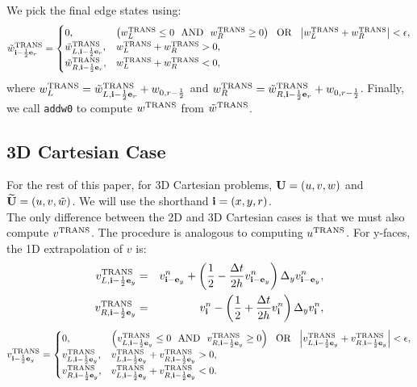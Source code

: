 We pick the final edge states using:
\begin{equation}
\tilde{w}^{\rm TRANS}_{{\bf i}-\frac{1}{2}{\bf e}_r} =
\begin{cases}
0, & \left(w_L^{\rm TRANS} \le 0 ~~ {\rm AND} ~~ w_R^{\rm TRANS} \ge 0\right) ~~ {\rm OR} ~~ \left|w_L^{\rm TRANS} + w_R^{\rm TRANS}\right| < \epsilon, \\
\tilde{w}_{L,{\bf i}-\frac{1}{2}{\bf e}_r}^{\rm TRANS}, & w_L^{\rm TRANS} + w_R^{\rm TRANS} > 0, \\
\tilde{w}_{R,{\bf i}-\frac{1}{2}{\bf e}_r}^{\rm TRANS}, & w_L^{\rm TRANS} + w_R^{\rm TRANS} < 0, \\
\end{cases}
\end{equation}
where $w_L^{\rm TRANS} = \tilde{w}_{L,{\bf i}-\frac{1}{2}{\bf e}_r}^{\rm TRANS} + w_{0,r-\frac{1}{2}}$
and $w_R^{\rm TRANS} = \tilde{w}_{R,{\bf i}-\frac{1}{2}{\bf e}_r}^{\rm TRANS} + w_{0,r-\frac{1}{2}}$.
Finally, we call {\tt addw0} to compute $w^{\rm TRANS}$ from
$\tilde{w}^{\rm TRANS}$.

\subsection{3D Cartesian Case}
For the rest of this paper, for 3D Cartesian problems, ${\bf U} = (u,v,w)$
and $\widetilde{{\bf U}} = (u,v,\tilde{w})$.  We will use the shorthand ${\bf i} = (x,y,r)$.\\

The only difference between the 2D and 3D Cartesian cases is that we
must also compute $v^{\rm TRANS}$.  The procedure is analogous to
computing $u^{\rm TRANS}$.  For y-faces, the 1D extrapolation of $v$ is:
\begin{eqnarray}
v_{L,{\bf i}-\frac{1}{2}{\bf e}_y}^{\rm TRANS} &=& v_{{\bf i}-{\bf e}_y}^n + \left(\frac{1}{2} - \frac{\Delta t}{2h}v_{{\bf i}-{\bf e}_y}^n\right)\Delta_y v_{{\bf i}-{\bf e}_y}^n, \\
v_{R,{\bf i}-\frac{1}{2}{\bf e}_y}^{\rm TRANS} &=& v_{{\bf i}}^n - \left(\frac{1}{2} + \frac{\Delta t}{2h}v_{{\bf i}}^n\right)\Delta_y v_{{\bf i}}^n,
\end{eqnarray}
\begin{equation}
v^{\rm TRANS}_{{\bf i}-\frac{1}{2}{\bf e}_y} =
\begin{cases}
0, & \left(v_{L,{\bf i}-\frac{1}{2}{\bf e}_y}^{\rm TRANS} \le 0 ~~ {\rm AND} ~~ v_{R,{\bf i}-\frac{1}{2}{\bf e}_y}^{\rm TRANS} \ge 0\right) ~~ {\rm OR} ~~ \left|v_{L,{\bf i}-\frac{1}{2}{\bf e}_y}^{\rm TRANS} + v_{R,{\bf i}-\frac{1}{2}{\bf e}_y}^{\rm TRANS}\right| < \epsilon, \\
v_{L,{\bf i}-\frac{1}{2}{\bf e}_y}^{\rm TRANS}, & v_{L,{\bf i}-\frac{1}{2}{\bf e}_y}^{\rm TRANS} + v_{R,{\bf i}-\frac{1}{2}{\bf e}_y}^{\rm TRANS} > 0, \\
v_{R,{\bf i}-\frac{1}{2}{\bf e}_y}^{\rm TRANS}, & v_{L,{\bf i}-\frac{1}{2}{\bf e}_y}^{\rm TRANS} + v_{R,{\bf i}-\frac{1}{2}{\bf e}_y}^{\rm TRANS} < 0. \\
\end{cases}
\end{equation}

